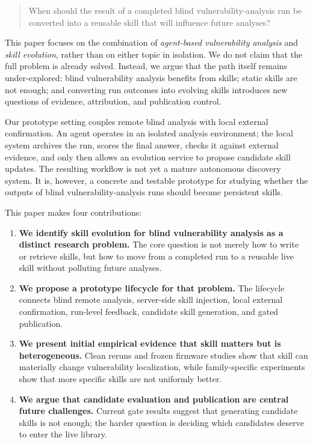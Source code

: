 \documentclass[11pt]{article}
\begin{document}
\begin{quote}
When should the result of a completed blind vulnerability-analysis run be converted into
a reusable skill that will influence future analyses?
\end{quote}

This paper focuses on the combination of \emph{agent-based vulnerability analysis} and
\emph{skill evolution}, rather than on either topic in isolation.  We do not claim that
the full problem is already solved.  Instead, we argue that the path itself remains
under-explored: blind vulnerability analysis benefits from skills; static skills are not
enough; and converting run outcomes into evolving skills introduces new questions of
evidence, attribution, and publication control.

Our prototype setting couples remote blind analysis with local external confirmation.
An agent operates in an isolated analysis environment; the local system archives the
run, scores the final answer, checks it against external evidence, and only then allows
an evolution service to propose candidate skill updates.  The resulting workflow is not
yet a mature autonomous discovery system.  It is, however, a concrete and testable
prototype for studying whether the outputs of blind vulnerability-analysis runs should
become persistent skills.

This paper makes four contributions:
\begin{enumerate}[leftmargin=*]
    \item \textbf{We identify skill evolution for blind vulnerability analysis as a
    distinct research problem.}  The core question is not merely how to write or retrieve
    skills, but how to move from a completed run to a reusable live skill without
    polluting future analyses.

    \item \textbf{We propose a prototype lifecycle for that problem.}  The lifecycle
    connects blind remote analysis, server-side skill injection, local external
    confirmation, run-level feedback, candidate skill generation, and gated publication.

    \item \textbf{We present initial empirical evidence that skill matters but is
    heterogeneous.}  Clean reruns and frozen firmware studies show that skill can
    materially change vulnerability localization, while family-specific experiments show
    that more specific skills are not uniformly better.

    \item \textbf{We argue that candidate evaluation and publication are central future
    challenges.}  Current gate results suggest that generating candidate skills is not
    enough; the harder question is deciding which candidates deserve to enter the live
    library.
\end{enumerate}
\end{document}
